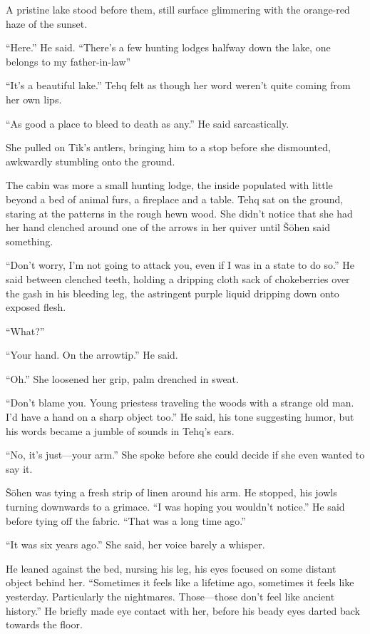 A pristine lake stood before them, still surface glimmering with the orange-red haze of the sunset.

``Here.'' He said. ``There's a few hunting lodges halfway down the lake, one belongs to my father-in-law''

``It's a beautiful lake.'' Tehq felt as though her word weren't quite coming from her own lips.

``As good a place to bleed to death as any.'' He said sarcastically.

She pulled on Tik's antlers, bringing him to a stop before she dismounted, awkwardly stumbling onto the ground.

The cabin was more a small hunting lodge, the inside populated with little beyond a bed of animal furs, a fireplace and a table. Tehq sat on the ground, staring at the patterns in the rough hewn wood. She didn't notice that she had her hand clenched around one of the arrows in her quiver until Šōhen said something.

``Don't worry, I'm not going to attack you, even if I was in a state to do so.'' He said between clenched teeth, holding a dripping cloth sack of chokeberries over the gash in his bleeding leg, the astringent purple liquid dripping down onto exposed flesh.

``What?''

``Your hand. On the arrowtip.'' He said.

``Oh.'' She loosened her grip, palm drenched in sweat.

``Don't blame you. Young priestess traveling the woods with a strange old man. I'd have a hand on a sharp object too.'' He said, his tone suggesting humor, but his words became a jumble of sounds in Tehq's ears.

``No, it's just---your arm.'' She spoke before she could decide if she even wanted to say it.

Šōhen was tying a fresh strip of linen around his arm. He stopped, his jowls turning downwards to a grimace. ``I was hoping you wouldn't notice.'' He said before tying off the fabric. ``That was a long time ago.''

``It was six years ago.'' She said, her voice barely a whisper.

He leaned against the bed, nursing his leg, his eyes focused on some distant object behind her. ``Sometimes it feels like a lifetime ago, sometimes it feels like yesterday. Particularly the nightmares. Those---those don't feel like ancient history.'' He briefly made eye contact with her, before his beady eyes darted back towards the floor.

